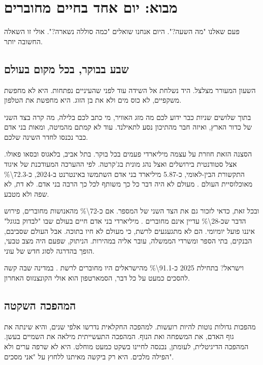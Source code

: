 \chapter{מבוא: יום אחד בחיים מחוברים}

\begin{epigraph}{}
פעם שאלנו "מה השעה?". היום אנחנו שואלים "כמה סוללה נשארה?". אולי זו השאלה החשובה יותר.
\end{epigraph}

\section{שבע בבוקר, בכל מקום בעולם}

השעון המעורר מצלצל. היד נשלחת אל השידה עוד לפני שהעיניים נפתחות. היא לא מחפשת משקפיים, לא כוס מים ולא את בן הזוג. היא מחפשת את הטלפון.

בתוך שלושים שניות כבר ידוע לכם מה מזג האוויר, מי כתב לכם בלילה, מה קרה בצד השני של כדור הארץ, ואיזה חבר מהתיכון נסע לתאילנד. עוד לא קמתם מהמיטה, ומאות בני אדם כבר נכנסו לחדר השינה שלכם.

הסצנה הזאת חוזרת על עצמה מיליארדי פעמים בכל בוקר. בתל אביב, בלאגוס ובסאו פאולו. אצל סטודנטית בירושלים ואצל נהג מונית בג'קרטה. לפי ההערכה המעודכנת של איגוד התקשורת הבין-לאומי, כ-5.87 מיליארד בני אדם השתמשו באינטרנט ב-2024, כ-\num{72.3\%} מאוכלוסיית העולם \parencite{itu2026data}. מעולם לא היה דבר כל כך משותף לכל כך הרבה בני אדם. לא דת, לא שפה ולא מטבע.

ובכל זאת, כדאי לזכור גם את הצד השני של המספר. אם כ-\num{72\%} מהאנושות מחוברים, פירוש הדבר שכ-\num{28\%} עדיין אינם מחוברים \parencite{itu2026data}. מיליארדי בני אדם חיים בעולם שבו "לבדוק בגוגל" איננו פועל יומיומי. הם לא מתגעגעים לרשת, כי מעולם לא חיו בתוכה. אבל העולם שסביבם, הבנקים, בתי הספר ומשרדי הממשלה, עובר אליה במהירות. הניתוק, שפעם היה מצב טבעי, הופך בהדרגה לסוג חדש של עוני.

וישראל? בתחילת 2025 כ-\num{91.1\%} מהישראלים היו מחוברים לרשת \parencite{kemp2025israel}. במדינה שבה קשה להסכים כמעט על כל דבר, הסמארטפון הוא אולי הקונצנזוס האחרון.

\section{המהפכה השקטה}

מהפכות גדולות נוטות להיות רועשות. למהפכה החקלאית נדרשו אלפי שנים, והיא שינתה את גוף האדם, את המשפחה ואת הנוף. המהפכה התעשייתית מילאה את השמיים בעשן. המהפכה הדיגיטלית, לעומתן, נכנסה לחיינו בשקט כמעט מוחלט. היא לא שרפה ערים ולא הפילה מלכים. היא רק ביקשה מאיתנו ללחוץ על "אני מסכים".

